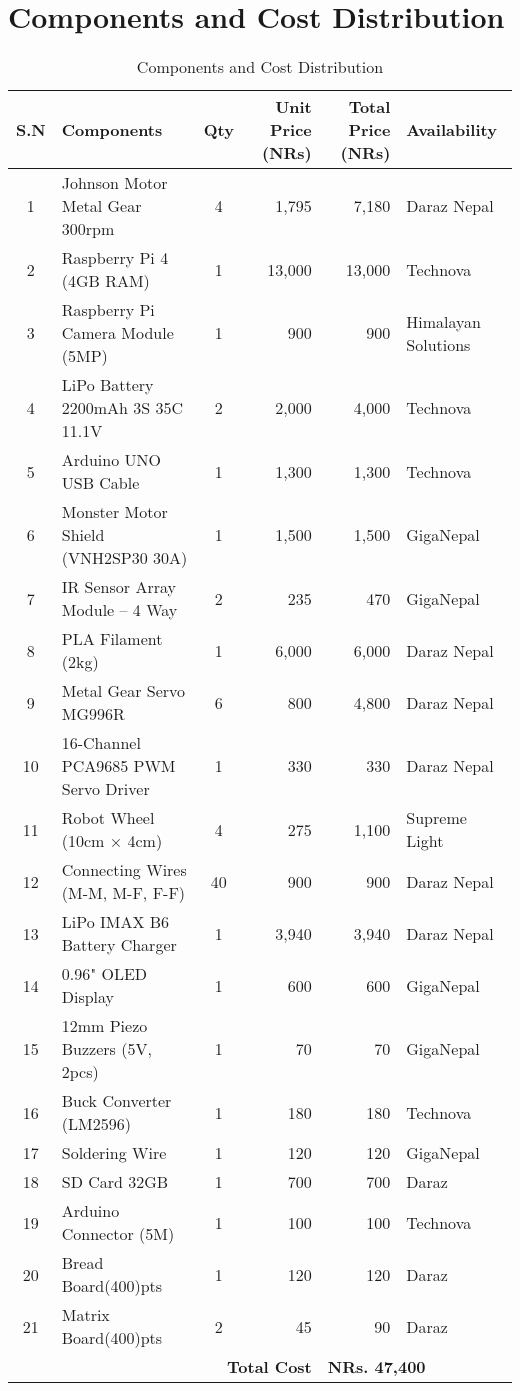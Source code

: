\section*{Components and Cost Distribution}

\begin{table}[h]
\centering
\small  %
\renewcommand{\arraystretch}{1.05}  %
\begin{tabular}{|c|p{4.6cm}|c|r|r|p{3cm}|}
\hline
\textbf{S.N} & \textbf{Components} & \textbf{Qty} & \textbf{Unit Price (NRs)} & \textbf{Total Price (NRs)} & \textbf{Availability} \\
\hline
1  & Johnson Motor Metal Gear 300rpm & 4 & 1,795 & 7,180 & Daraz Nepal \\\hline
2  & Raspberry Pi 4 (4GB RAM) & 1 & 13,000 & 13,000 & Technova \\\hline
3  & Raspberry Pi Camera Module (5MP) & 1 & 900 & 900 & Himalayan Solutions \\\hline
4  & LiPo Battery 2200mAh 3S 35C 11.1V & 2 & 2,000 & 4,000 & Technova \\\hline
5  & Arduino UNO USB Cable & 1 & 1,300 & 1,300 & Technova \\\hline
6  & Monster Motor Shield (VNH2SP30 30A) & 1 & 1,500 & 1,500 & GigaNepal \\\hline
7  & IR Sensor Array Module – 4 Way & 2 & 235 & 470 & GigaNepal \\\hline
8  & PLA Filament (2kg) & 1 & 6,000 & 6,000 & Daraz Nepal \\\hline
9  & Metal Gear Servo MG996R & 6 & 800 & 4,800 & Daraz Nepal \\\hline
10 & 16-Channel PCA9685 PWM Servo Driver & 1 & 330 & 330 & Daraz Nepal \\\hline
11 & Robot Wheel (10cm × 4cm) & 4 & 275 & 1,100 & Supreme Light \\\hline
12 & Connecting Wires (M-M, M-F, F-F) & 40 & 900 & 900 & Daraz Nepal \\\hline
13 & LiPo IMAX B6 Battery Charger & 1 & 3,940 & 3,940 & Daraz Nepal \\\hline
14 & 0.96" OLED Display & 1 & 600 & 600 & GigaNepal \\\hline
15 & 12mm Piezo Buzzers (5V, 2pcs) & 1 & 70 & 70 & GigaNepal \\\hline
16 & Buck Converter (LM2596) & 1 & 180 & 180 & Technova \\\hline
17 & Soldering Wire & 1 & 120 & 120 & GigaNepal \\\hline
18 & SD Card 32GB & 1 & 700 & 700 & Daraz \\\hline
19 & Arduino Connector (5M) & 1 & 100 & 100 & Technova \\
\hline
20 & Bread Board(400)pts & 1 & 120 & 120 & Daraz \\
\hline
21 & Matrix Board(400)pts & 2 & 45  & 90 & Daraz \\
\hline
\multicolumn{4}{|r|}{\textbf{Total Cost}} & \multicolumn{2}{l|}{\textbf{NRs. 47,400}} \\
\hline
\end{tabular}
\caption{Components and Cost Distribution}
\end{table}
